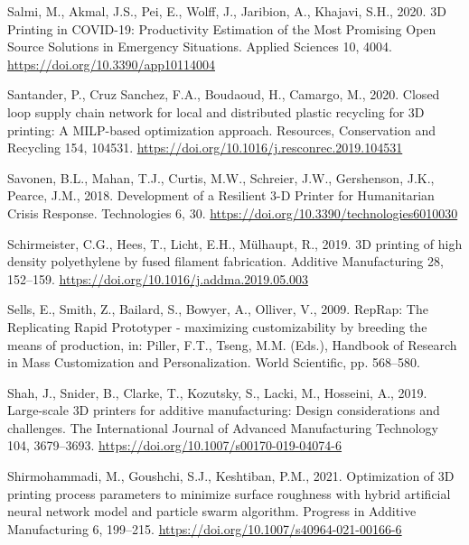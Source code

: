 \documentclass[
  12pt,
  number,
  review]{elsarticle}
\newlength{\cslhangindent}
\newlength{\cslentryspacingunit} %
\newenvironment{CSLReferences}[2] %
 {%
  \setlength{\parindent}{0pt}
  \ifodd #1
  \let\oldpar\par
  \def\par{\hangindent=\cslhangindent\oldpar}
  \fi
  \setlength{\parskip}{#2\cslentryspacingunit}
 }%
 {}
\begin{document}
\begin{CSLReferences}{1}{0}
\leavevmode{}%
Salmi, M., Akmal, J.S., Pei, E., Wolff, J., Jaribion, A., Khajavi, S.H.,
2020. {3D Printing} in {COVID-19}: {Productivity Estimation} of the
{Most Promising Open Source Solutions} in {Emergency Situations}.
Applied Sciences 10, 4004. \url{https://doi.org/10.3390/app10114004}

\leavevmode{}%
Santander, P., Cruz Sanchez, F.A., Boudaoud, H., Camargo, M., 2020.
Closed loop supply chain network for local and distributed plastic
recycling for {3D} printing: A {MILP-based} optimization approach.
Resources, Conservation and Recycling 154, 104531.
\url{https://doi.org/10.1016/j.resconrec.2019.104531}

\leavevmode{}%
Savonen, B.L., Mahan, T.J., Curtis, M.W., Schreier, J.W., Gershenson,
J.K., Pearce, J.M., 2018. Development of a {Resilient} 3-{D Printer} for
{Humanitarian Crisis Response}. Technologies 6, 30.
\url{https://doi.org/10.3390/technologies6010030}

\leavevmode{}%
Schirmeister, C.G., Hees, T., Licht, E.H., Mülhaupt, R., 2019. {3D}
printing of high density polyethylene by fused filament fabrication.
Additive Manufacturing 28, 152--159.
\url{https://doi.org/10.1016/j.addma.2019.05.003}

\leavevmode{}%
Sells, E., Smith, Z., Bailard, S., Bowyer, A., Olliver, V., 2009.
{RepRap}: {The Replicating Rapid Prototyper} - maximizing
customizability by breeding the means of production, in: Piller, F.T.,
Tseng, M.M. (Eds.), Handbook of {Research} in {Mass Customization} and
{Personalization}. {World Scientific}, pp. 568--580.

\leavevmode{}%
Shah, J., Snider, B., Clarke, T., Kozutsky, S., Lacki, M., Hosseini, A.,
2019. Large-scale {3D} printers for additive manufacturing: Design
considerations and challenges. The International Journal of Advanced
Manufacturing Technology 104, 3679--3693.
\url{https://doi.org/10.1007/s00170-019-04074-6}

\leavevmode{}%
Shirmohammadi, M., Goushchi, S.J., Keshtiban, P.M., 2021. Optimization
of {3D} printing process parameters to minimize surface roughness with
hybrid artificial neural network model and particle swarm algorithm.
Progress in Additive Manufacturing 6, 199--215.
\url{https://doi.org/10.1007/s40964-021-00166-6}


\end{CSLReferences}
\end{document}
